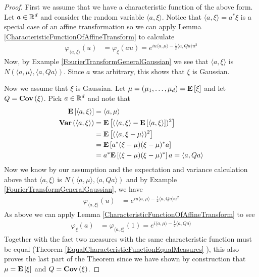 \begin{proof}
First we assume that we have a characteristic function of the above
form.  Let $a \in \mathbb{R}^d$ and consider the random variable $\langle
a, \xi \rangle$.  Notice that $\langle a, \xi \rangle = a^* \xi$ is a
special case of an affine transformation so we
can apply Lemma
\ref{CharacteristicFunctionOfAffineTransform} to calculate
\begin{align*}
\varphi_{\langle a, \xi \rangle}(u) &= \varphi_\xi(a u) = e^{i u \langle
  a, \mu\rangle - \frac{1}{2}\langle a, Q a\rangle u^2} 
\end{align*}
Now, by Example \ref{FourierTransformGeneralGaussian}
we see that $\langle a, \xi \rangle$ is $N(\langle
  a, \mu\rangle, \langle a, Q a\rangle)$.  Since $a$ was arbitrary,
  this shows that $\xi$ is Gaussian.

Now we assume that $\xi$ is Gaussian.  Let $\mu = (\mu_1, \dots,
\mu_d) = \textbf{E}\left[\xi\right]$ and let $Q = \textbf{Cov} \left (\xi \right )$.  Pick $a
\in \mathbb{R}^d$ and note that 
\begin{align*}
\textbf{E}\left[\langle a,\xi \rangle\right] &= \langle a, \mu \rangle \\
\textbf{Var} \left (\langle a,\xi \rangle \right ) &= \textbf{E}\left[(\langle a,\xi
  \rangle - \textbf{E}\left[\langle a,\xi \rangle\right])^2\right] \\
&=  \textbf{E}\left[(\langle a,\xi - \mu  \rangle)^2\right] \\
&=  \textbf{E}\left[a^* (\xi - \mu) (\xi - \mu)^* a\right] \\
&= a^*\textbf{E}\left[ (\xi - \mu) (\xi - \mu)^*\right]a = \langle a, Q a
\rangle \\
\end{align*}
Now we know by our assumption and the expectation and variance
calculation above  that $\langle a, \xi \rangle$ is
$N(\langle a, \mu \rangle, \langle a, Q a \rangle)$ and by Example
\ref{FourierTransformGeneralGaussian}, we have
\begin{align*}
\varphi_{\langle a, \xi \rangle}(u) &= e^{iu \langle a, \mu \rangle -
  \frac{1}{2}\langle a, Q a \rangle u^2}
\end{align*}
As above we can apply Lemma
\ref{CharacteristicFunctionOfAffineTransform}
to see
\begin{align*}
\varphi_\xi(a) &= \varphi_{\langle a, \xi \rangle}(1) =  e^{i \langle a, \mu \rangle -  \frac{1}{2}\langle a, Q a \rangle}
\end{align*}
Together with the fact two measures with the same characteristic
function must be equal (Theorem
\ref{EqualCharacteristicFunctionEqualMeasures} ), this also proves the last part of the Theorem since we have shown by
construction that $\mu = \textbf{E}\left[\xi\right]$ and $Q = \textbf{Cov} \left (\xi \right )$.
\end{proof}

